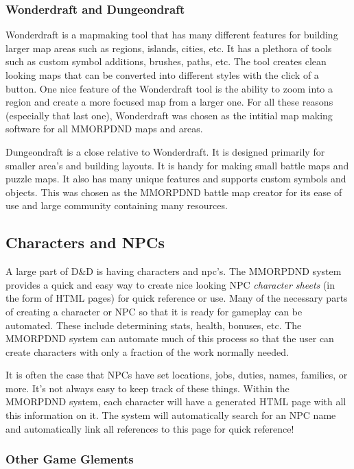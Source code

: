 \subsubsection{Wonderdraft and Dungeondraft}

Wonderdraft is a mapmaking tool that has many different features for building larger map areas such as regions, islands, cities, etc. It has a plethora of tools such as custom symbol additions, brushes, paths, etc. The tool creates clean looking maps that can be converted into different styles with the click of a button. One nice feature of the Wonderdraft tool is the ability to zoom into a region and create a more focused map from a larger one. For all these reasons (especially that last one), Wonderdraft was chosen as the intitial map making software for all MMORPDND maps and areas.

Dungeondraft is a close relative to Wonderdraft. It is designed primarily for smaller area's and building layouts. It is handy for making small battle maps and puzzle maps. It also has many unique features and supports custom symbols and objects. This was chosen as the MMORPDND battle map creator for its ease of use and large community containing many resources.

\subsection{Characters and NPCs}

A large part of D\&D is having characters and npc's. The MMORPDND system provides a quick and easy way to create nice looking NPC \textit{character sheets} (in the form of HTML pages) for quick reference or use. Many of the necessary parts of creating a character or NPC so that it is ready for gameplay can be automated. These include determining stats, health, bonuses, etc. The MMORPDND system can automate much of this process so that the user can create characters with only a fraction of the work normally needed.

It is often the case that NPCs have set locations, jobs, duties, names, families, or more. It's not always easy to keep track of these things. Within the MMORPDND system, each character will have a generated HTML page with all this information on it. The system will automatically search for an NPC name and automatically link all references to this page for quick reference!

\subsubsection{Other Game Glements}

